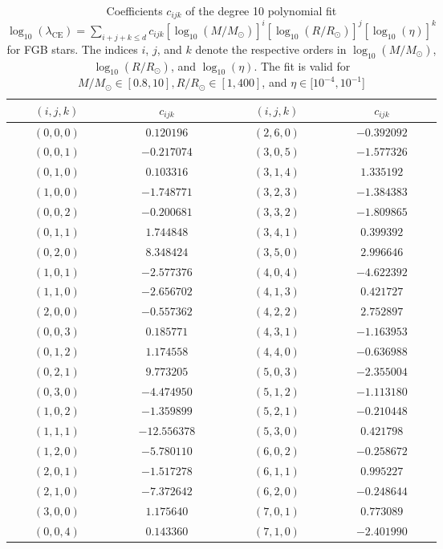 \begin{table}
\centering
\caption{Coefficients $c_{ijk}$ of the degree 10 polynomial fit $\log_{10}(\lambda_{\mathrm{CE}})=\sum_{i+j+k\leq d}c_{ijk}\left[\log_{10}(M/M_\odot)\right]^i\left[\log_{10}(R/R_\odot)\right]^j\left[\log_{10}(\eta)\right]^k$ for FGB stars. The indices $i$, $j$, and $k$ denote the respective orders in $\log_{10}(M/M_\odot)$, $\log_{10}(R/R_\odot)$, and $\log_{10}(\eta)$. The fit is valid for $M/M_\odot\in[0.8,10], R/R_\odot\in[1,400]$, and $\eta\in[10^{-4},10^{-1}$]}
\label{tab:lambda_ce_3d_coef_FGB}
\begin{tabular}{cc@{\qquad}cc}
\hline
$(i,j,k)$ & $c_{ijk}$ & $(i,j,k)$ & $c_{ijk}$ \\
\hline
$(0,0,0)$ & $0.120196$ & $(2,6,0)$ & $-0.392092$ \\
$(0,0,1)$ & $-0.217074$ & $(3,0,5)$ & $-1.577326$ \\
$(0,1,0)$ & $0.103316$ & $(3,1,4)$ & $1.335192$ \\
$(1,0,0)$ & $-1.748771$ & $(3,2,3)$ & $-1.384383$ \\
$(0,0,2)$ & $-0.200681$ & $(3,3,2)$ & $-1.809865$ \\
$(0,1,1)$ & $1.744848$ & $(3,4,1)$ & $0.399392$ \\
$(0,2,0)$ & $8.348424$ & $(3,5,0)$ & $2.996646$ \\
$(1,0,1)$ & $-2.577376$ & $(4,0,4)$ & $-4.622392$ \\
$(1,1,0)$ & $-2.656702$ & $(4,1,3)$ & $0.421727$ \\
$(2,0,0)$ & $-0.557362$ & $(4,2,2)$ & $2.752897$ \\
$(0,0,3)$ & $0.185771$ & $(4,3,1)$ & $-1.163953$ \\
$(0,1,2)$ & $1.174558$ & $(4,4,0)$ & $-0.636988$ \\
$(0,2,1)$ & $9.773205$ & $(5,0,3)$ & $-2.355004$ \\
$(0,3,0)$ & $-4.474950$ & $(5,1,2)$ & $-1.113180$ \\
$(1,0,2)$ & $-1.359899$ & $(5,2,1)$ & $-0.210448$ \\
$(1,1,1)$ & $-12.556378$ & $(5,3,0)$ & $0.421798$ \\
$(1,2,0)$ & $-5.780110$ & $(6,0,2)$ & $-0.258672$ \\
$(2,0,1)$ & $-1.517278$ & $(6,1,1)$ & $0.995227$ \\
$(2,1,0)$ & $-7.372642$ & $(6,2,0)$ & $-0.248644$ \\
$(3,0,0)$ & $1.175640$ & $(7,0,1)$ & $0.773089$ \\
$(0,0,4)$ & $0.143360$ & $(7,1,0)$ & $-2.401990$ \\

\end{tabular}
\end{table}
